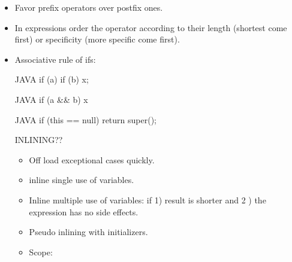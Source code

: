 \begin{itemize}
  \item Favor prefix operators over postfix ones.
  \item In expressions order the operator according to their length (shortest
        come first) or specificity (more specific come first).
  \item Associative rule of ifs:
\begin{code}{JAVA}
if (a) if (b) x;
\end{code}
\begin{code}{JAVA}
if (a && b) x
\end{code}
  \begin{code}{JAVA}
if (this == null) return super();
  \end{code}


INLINING??
\begin{itemize}
  \item Off load exceptional cases quickly.
  \item inline single use of variables.
  \item Inline multiple use of variables: if 1) result is shorter and 2
        ) the expression has no side effects.
  \item Pseudo inlining with initializers.
  \item Scope:
\end{itemize}


\end{itemize}

